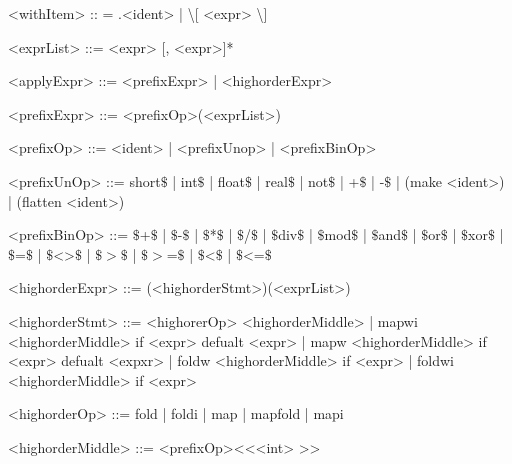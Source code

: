 \documentclass{article}
\begin{document}
\begin{grammar}
<withItem> :: = .<ident> | \textbackslash[ <expr> \textbackslash]

<exprList> ::= <expr> [, <expr>]*

<applyExpr> ::= <prefixExpr> | <highorderExpr>

<prefixExpr> ::= <prefixOp>(<exprList>)

<prefixOp> ::= <ident> | <prefixUnop> | <prefixBinOp>

<prefixUnOp> ::= short\(\$\) | int\(\$\) | float\(\$\) | real\(\$\) | not\(\$\) | +\(\$\) | -\(\$\) | (make <ident>) | (flatten <ident>)

<prefixBinOp> ::= \(\$\)+\(\$\) | \(\$\)-\(\$\) | \(\$\)*\(\$\) | \(\$\)/\(\$\) |
                  \(\$\)div\(\$\) | \(\$\)mod\(\$\) | \(\$\)and\(\$\) | \(\$\)or\(\$\) | \(\$\)xor\(\$\) |
                  \(\$\)=\(\$\) | \(\$\)<>\(\$\) | \(\$\)\(>\)\(\$\) | \(\$\)\(>\)=\(\$\) | \(\$\)\textless\(\$\) | \(\$\)\textless=\(\$\)

<highorderExpr> ::= (<highorderStmt>)(<exprList>)

<highorderStmt> ::= <highorerOp> <highorderMiddle> |
                    mapwi <highorderMiddle> if <expr> defualt <expr> |
                    mapw <highorderMiddle> if <expr> defualt <expxr> |
                    foldw <highorderMiddle> if <expr> |
                    foldwi <highorderMiddle> if <expr>

<highorderOp> ::= fold | foldi | map | mapfold | mapi

<highorderMiddle> ::= <prefixOp>\textless \textless <int> \textgreater \textgreater




\end{grammar}
\end{document}
